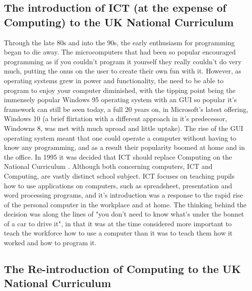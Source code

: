 \documentclass[ %
                    author={Jonathan Rankin},
                supervisor={Dr. David May, Dr. Ian Holyer},
                    degree={MEng},
                     title={CodeTouch},
                  subtitle={A Revolutionary Way To Program Real Code On Touch Screen Devices},
                      type={enterprise},
                      year={2015 } ]{dissertation}
\begin{document}
\subsection{The introduction of ICT (at the expense of Computing) to the UK National Curriculum}
Through the late 80s and into the 90s, the early enthusiasm for programming began to die away. The microcomputers that had been so popular encouraged programming as if you couldn't program it yourself they really couldn't do very much, putting the onus on the user to create their own fun with it. However, as operating systems grew in power and functionality, the need to be able to program to enjoy your computer diminished, with the tipping point being the immensely popular Windows 95 operating system with an GUI so popular it's framework can still be seen today,  a full 20 years on, in Microsoft's latest offering, Windows 10 (a brief flirtation with a different approach in it's predecessor, Windowns 8, was met with much uproad and little uptake). The rise of the GUI operating system meant that one could operate a computer without having to know any programming, and as a result their popularity boomed at home and in the office. 
In 1995 it was decided that ICT should replace Computing on the National Curriculum \cite{ICTcurric}. Although both concerning computers, ICT and Computing, are vastly distinct school subject. ICT focuses on teaching pupils how to use applications on computers, such as spreadsheet, presentation and word processing programs, and it's introduction was a response to the rapid rise of the personal computer in the workplace and at home. The thinking behind the decision was along the lines of "you don’t need to know what’s under the bonnet of a car to drive it", in that it was at the time considered more important to teach the workforce how to use a computer than it was to teach them how it worked and how to program it. 

\subsection{The Re-introduction of Computing to the UK National Curriculum}
\end{document}

